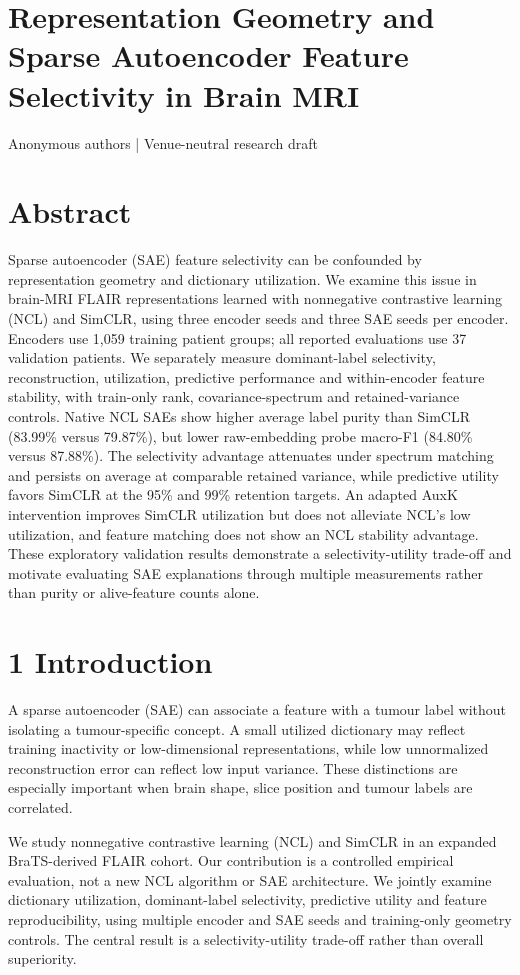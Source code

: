 \documentclass[10pt]{article}
\begin{document}
\section*{Representation Geometry and Sparse Autoencoder Feature Selectivity in Brain MRI}
Anonymous authors | Venue-neutral research draft

\section*{Abstract}
Sparse autoencoder (SAE) feature selectivity can be confounded by representation geometry and dictionary utilization. We examine this issue in brain-MRI FLAIR representations learned with nonnegative contrastive learning (NCL) and SimCLR, using three encoder seeds and three SAE seeds per encoder. Encoders use 1,059 training patient groups; all reported evaluations use 37 validation patients. We separately measure dominant-label selectivity, reconstruction, utilization, predictive performance and within-encoder feature stability, with train-only rank, covariance-spectrum and retained-variance controls. Native NCL SAEs show higher average label purity than SimCLR (83.99\% versus 79.87\%), but lower raw-embedding probe macro-F1 (84.80\% versus 87.88\%). The selectivity advantage attenuates under spectrum matching and persists on average at comparable retained variance, while predictive utility favors SimCLR at the 95\% and 99\% retention targets. An adapted AuxK intervention improves SimCLR utilization but does not alleviate NCL's low utilization, and feature matching does not show an NCL stability advantage. These exploratory validation results demonstrate a selectivity-utility trade-off and motivate evaluating SAE explanations through multiple measurements rather than purity or alive-feature counts alone. 

\section*{1  Introduction}
A sparse autoencoder (SAE) can associate a feature with a tumour label without isolating a tumour-specific concept. A small utilized dictionary may reflect training inactivity or low-dimensional representations, while low unnormalized reconstruction error can reflect low input variance. These distinctions are especially important when brain shape, slice position and tumour labels are correlated.

We study nonnegative contrastive learning (NCL) and SimCLR in an expanded BraTS-derived FLAIR cohort. Our contribution is a controlled empirical evaluation, not a new NCL algorithm or SAE architecture. We jointly examine dictionary utilization, dominant-label selectivity, predictive utility and feature reproducibility, using multiple encoder and SAE seeds and training-only geometry controls. The central result is a selectivity-utility trade-off rather than overall superiority.
\end{document}
